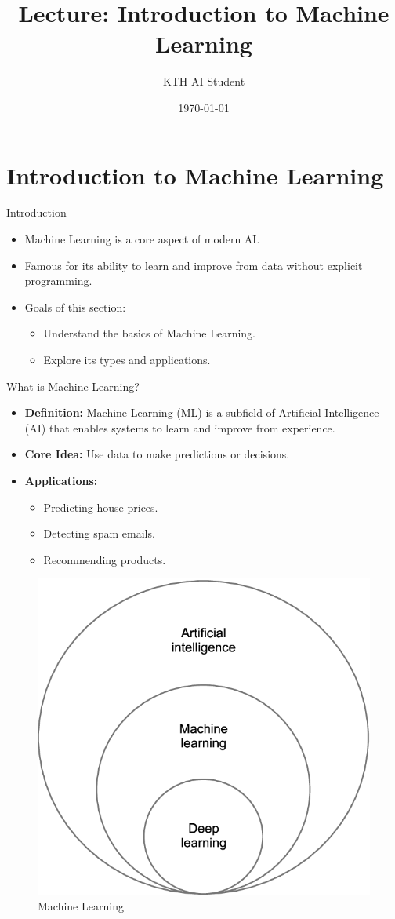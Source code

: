 \documentclass{beamer}
\title{Lecture: Introduction to Machine Learning}
\author{KTH AI Student}
\date{\today}
\begin{document}
\frame{\titlepage}

\section{Introduction to Machine Learning}

\begin{frame}{Introduction}
\begin{itemize}
    \item Machine Learning is a core aspect of modern AI.
    \item Famous for its ability to learn and improve from data without explicit programming.
    \item Goals of this section:
    \begin{itemize}
        \item Understand the basics of Machine Learning.
        \item Explore its types and applications.
    \end{itemize}
\end{itemize}
\end{frame}

\begin{frame}{What is Machine Learning?}
\begin{itemize}
    \item \textbf{Definition:} Machine Learning (ML) is a subfield of Artificial Intelligence (AI) that enables systems to learn and improve from experience.
    \item \textbf{Core Idea:} Use data to make predictions or decisions.
    \item \textbf{Applications:}
    \begin{itemize}
        \item Predicting house prices.
        \item Detecting spam emails.
        \item Recommending products.
    \end{itemize}
\end{itemize}
\begin{figure}
    \centering
    \includegraphics[width=0.4\linewidth]{imgs/ML.png}
    \caption{Machine Learning}
\end{figure}
\end{frame}
\end{document}
